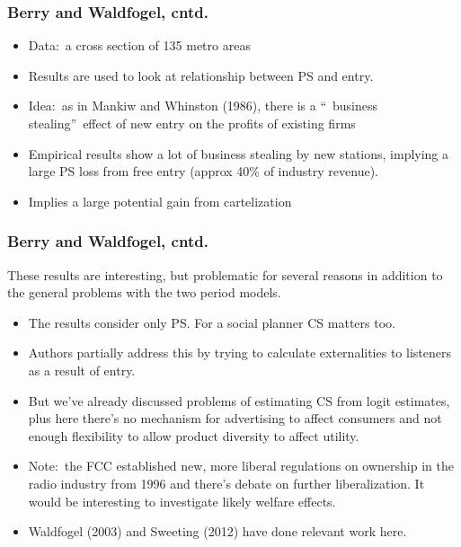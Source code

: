 \documentclass[notes=show]{beamer}
\begin{document}
\begin{frame}%

\frametitle{Berry and Waldfogel, cntd.}

\begin{itemize}
\item Data:\ a cross section of 135 metro areas

\item Results are used to look at relationship between PS and entry.

\item Idea:\ as in Mankiw and Whinston (1986), there is a \textquotedblleft\
business stealing\textquotedblright\ effect of new entry on the profits of
existing firms

\item Empirical results show a lot of business stealing by new stations,
implying a large PS loss from free entry (approx 40\% of industry revenue).

\item Implies a large potential gain from cartelization
\end{itemize}

\end{frame}%

\begin{frame}%

\frametitle{Berry and Waldfogel, cntd.}

These results are interesting, but problematic for several reasons in
addition to the general problems with the two period models.

\begin{itemize}
\item The results consider only PS. For a social planner CS matters too.

\item Authors partially address this by trying to calculate externalities to
listeners as a result of entry.

\item But we've already discussed problems of estimating CS from logit
estimates, plus here there's no mechanism for advertising to affect
consumers and not enough flexibility to allow product diversity to affect
utility.

\item Note:\ the FCC established new, more liberal regulations on ownership
in the radio industry from 1996 and there's debate on further
liberalization. It would be interesting to investigate likely welfare
effects.

\item Waldfogel (2003) and Sweeting (2012) have done relevant work here.
\end{itemize}

\end{frame}%
\end{document}
